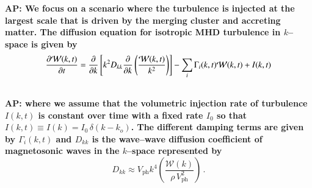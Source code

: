 \documentclass[a4paper,fleqn,usenatbib]{mnras}
\newcommand{\Vph}{V_\mathrm{ph}}
\def\AP#1{{\bf  AP: #1}}
\begin{document}
\AP{We focus on a scenario where the turbulence is injected at the
  largest scale that is driven by the merging cluster and accreting
  matter. The diffusion equation for isotropic MHD turbulence in
  $k$--space is given by}
\begin{eqnarray}
&{{\partial {\mathcal W}(k,t) }\over{\partial t}}
=
{{\partial}\over{\partial k}}
\left[
k^2 D_{kk}
{{\partial}\over{\partial k}}
\left( {{ {\mathcal W}(k,t) }\over{k^2}} \right)
\right]
- \sum_i \Gamma_i (k,t) {\mathcal W}(k,t)
+ I(k,t)\nonumber\\
&
\label{modes_kinetic}
\end{eqnarray}
\AP{where we assume that the volumetric injection rate of turbulence
  $I(k,t)$ is constant over time with a fixed rate $I_0$ so that
  $I(k,t) \equiv I(k) = I_0\,\delta (k - k_o)$. The different damping
  terms are given by $\Gamma_i(k,t)$ and $D_{kk}$ is the wave--wave diffusion
  coefficient of magnetosonic waves in the $k$--space represented by
  \begin{equation}
    \label{eq:Dkk}
    D_{kk} \approx \Vph k^4
    \left(\frac{\mathcal{W}(k)}{\rho\,\Vph^2}\right)\,.
  \end{equation}
}
\end{document}
